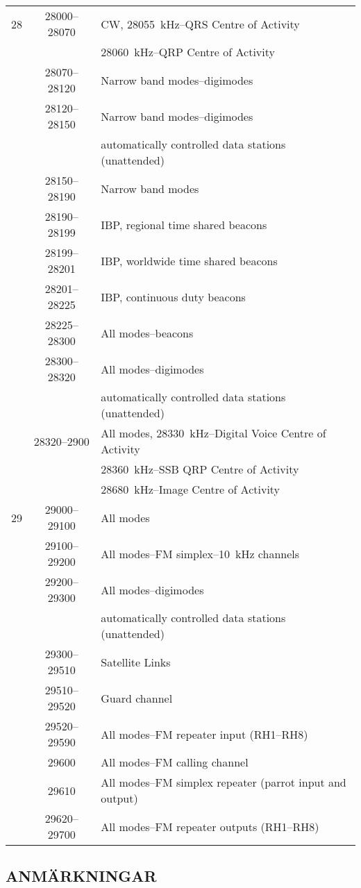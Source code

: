 \begin{longtable}{lcl}
28   & 28000--28070 & CW, 28055~kHz--QRS Centre of Activity\\
 & & 28060~kHz--QRP Centre of Activity\\
     & 28070--28120 & Narrow band modes--digimodes\\
     & 28120--28150 & Narrow band modes--digimodes\\
     & & automatically controlled data stations (unattended)\\
     & 28150--28190 & Narrow band modes\\
     & 28190--28199 & IBP, regional time shared beacons\\
     & 28199--28201 & IBP, worldwide time shared beacons\\
     & 28201--28225 & IBP, continuous duty beacons\\
     & 28225--28300 & All modes--beacons\\
     & 28300--28320 & All modes--digimodes\\
     & & automatically controlled data stations (unattended)\\
     & 28320--2900 & All modes, 28330~kHz--Digital Voice Centre of Activity\\
     & & 28360~kHz--SSB QRP Centre of Activity\\
     & & 28680~kHz--Image Centre of Activity\\

29   & 29000--29100 & All modes\\
     & 29100--29200 & All modes--FM simplex--10~kHz channels\\
     & 29200--29300 & All modes--digimodes\\
     & & automatically controlled data stations (unattended)\\
     & 29300--29510 & Satellite Links\\
     & 29510--29520 & Guard channel\\
     & 29520--29590 & All modes--FM repeater input (RH1--RH8)\\
     & 29600 & All modes--FM calling channel\\
     & 29610 & All modes--FM simplex repeater (parrot input and output)\\
     & 29620--29700 & All modes--FM repeater outputs (RH1--RH8)\\
\end{longtable}

\subsection{ANMÄRKNINGAR}

